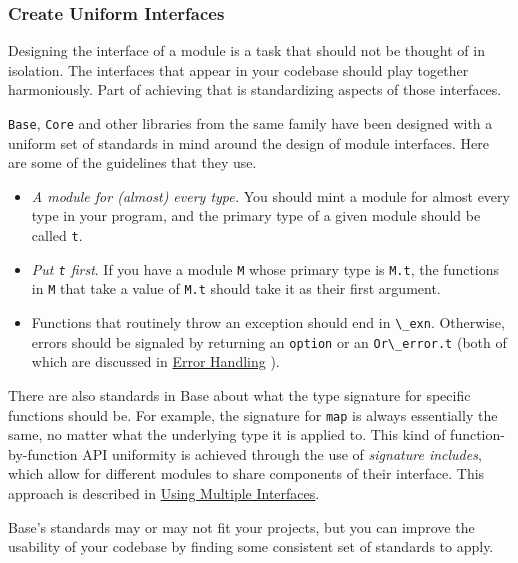 \hypertarget{create-uniform-intefaces}{%
\subsubsection{Create Uniform
Interfaces}\label{create-uniform-intefaces}}

Designing the interface of a module is a task that should not be thought
of in isolation. The interfaces that appear in your codebase should play
together harmoniously. Part of achieving that is standardizing aspects
of those interfaces.

\passthrough{\lstinline!Base!}, \passthrough{\lstinline!Core!} and other
libraries from the same family have been designed with a uniform set of
standards in mind around the design of module interfaces. Here are some
of the guidelines that they use.

\begin{itemize}
\item
  \emph{A module for (almost) every type.} You should mint a module for
  almost every type in your program, and the primary type of a given
  module should be called \passthrough{\lstinline!t!}.
\item
  \emph{Put \passthrough{\lstinline!t!} first}. If you have a module
  \passthrough{\lstinline!M!} whose primary type is
  \passthrough{\lstinline!M.t!}, the functions in
  \passthrough{\lstinline!M!} that take a value of
  \passthrough{\lstinline!M.t!} should take it as their first argument.
\item
  Functions that routinely throw an exception should end in
  \passthrough{\lstinline!\_exn!}. Otherwise, errors should be signaled
  by returning an \passthrough{\lstinline!option!} or an
  \passthrough{\lstinline!Or\_error.t!} (both of which are discussed in
  \href{error-handling.html\#error-handling}{Error Handling} ).
\end{itemize}

There are also standards in Base about what the type signature for
specific functions should be. For example, the signature for
\passthrough{\lstinline!map!} is always essentially the same, no matter
what the underlying type it is applied to. This kind of
function-by-function API uniformity is achieved through the use of
\emph{signature includes}, which allow for different modules to share
components of their interface. This approach is described in
\href{functors.html\#using-multiple-interfaces}{Using Multiple
Interfaces}.

Base's standards may or may not fit your projects, but you can improve
the usability of your codebase by finding some consistent set of
standards to apply.

